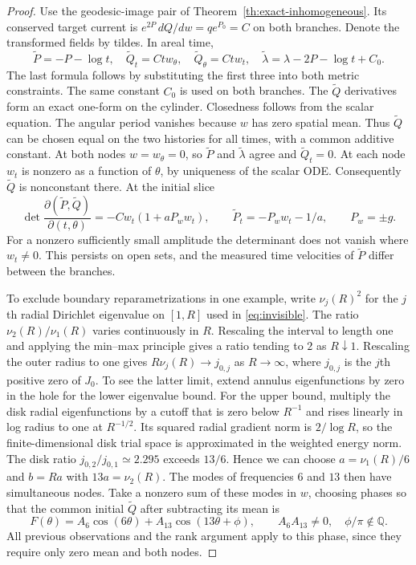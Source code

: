 \begin{proof}
Use the geodesic-image pair of Theorem~\ref{th:exact-inhomogeneous}.
Its conserved target current is
$e^{2P}\,dQ/dw=q e^{P_0}=C$ on both branches.
Denote the transformed fields by tildes. In areal time,
\begin{equation}
 \widetilde P=-P-\log t,\quad
 \widetilde Q_t=Ct w_\theta,\quad
 \widetilde Q_\theta=Ct w_t,\quad
 \widetilde\lambda=\lambda-2P-\log t+C_0 .
 \label{eq:ernst}
\end{equation}
The last formula follows by substituting the first three into
both metric constraints. The same constant $C_0$ is used
on both branches.
The $\widetilde Q$ derivatives form an exact one-form on
the cylinder. Closedness follows from the scalar equation.
The angular period vanishes because $w$ has zero spatial mean.
Thus $\widetilde Q$ can be chosen equal on the two histories
for all times, with a common additive constant.
At both nodes $w=w_\theta=0$, so $\widetilde P$ and
$\widetilde\lambda$ agree and
$\widetilde Q_t=0$. At each node $w_t$ is nonzero as a
function of $\theta$, by uniqueness of the scalar ODE.
Consequently $\widetilde Q$ is nonconstant there.
At the initial slice
\[
 \det \frac{\partial(\widetilde P,\widetilde Q)}
                  {\partial(t,\theta)}
     =-C w_t(1+aP_w w_t),\qquad
 \widetilde P_t=-P_w w_t-1/a,\qquad P_w=\pm g.
\]
For a nonzero sufficiently small amplitude the determinant
does not vanish where $w_t\ne0$. This persists on open sets,
and the measured time velocities of $\widetilde P$ differ
between the branches.

To exclude boundary reparametrizations in one example,
write $\nu_j(R)^2$ for the $j$th radial Dirichlet eigenvalue
on $[1,R]$ used in \eqref{eq:invisible}.
The ratio $\nu_2(R)/\nu_1(R)$ varies continuously in $R$.
Rescaling the interval to length one and applying the
min--max principle gives a ratio tending to $2$ as $R\downarrow1$.
Rescaling the outer radius to one gives
$R\nu_j(R)\to j_{0,j}$ as $R\to\infty$, where $j_{0,j}$
is the $j$th positive zero of $J_0$.
To see the latter limit, extend annulus eigenfunctions by zero
in the hole for the lower eigenvalue bound. For the upper bound,
multiply the disk radial eigenfunctions by a cutoff that is
zero below $R^{-1}$ and rises linearly in log radius to one
at $R^{-1/2}$. Its squared radial gradient norm is
$2/\log R$, so the finite-dimensional disk trial space is
approximated in the weighted energy norm. The disk ratio
$j_{0,2}/j_{0,1}\simeq 2.295$ exceeds $13/6$.
Hence we can choose $a=\nu_1(R)/6$ and $b=Ra$ with
$13a=\nu_2(R)$. The modes of frequencies $6$ and $13$
then have simultaneous nodes. Take a nonzero sum of these
modes in $w$, choosing phases so that the common initial
$\widetilde Q$ after subtracting its mean is
\[
 F(\theta)=A_6\cos(6\theta)+A_{13}\cos(13\theta+\phi),
 \qquad A_6A_{13}\ne0,\quad \phi/\pi\notin\mathbb Q .
\]
All previous observations and the rank argument apply to
this phase, since they require only zero mean and both nodes.


\end{proof}
